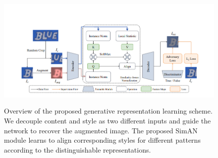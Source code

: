 \documentclass{article}
\begin{document}
\begin{figure}[H]
         \centering
         \includegraphics[width=\textwidth]{3.png}
         \label{fig:three}
         \caption{Overview of the proposed generative representation learning scheme. We decouple content and style as two different inputs and
guide the network to recover the augmented image. The proposed SimAN module learns to align corresponding styles for different patterns
according to the distinguishable representations.}
\end{figure}
\end{document}
